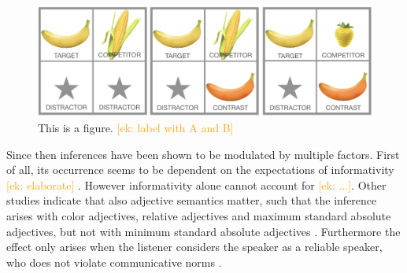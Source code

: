 \documentclass[10pt,letterpaper]{article}
\newcommand{\ek}[1]{\textcolor{Orange}{[ek: #1]}}
\newcommand{\jd}[1]{\textcolor{Purple}{[jd: #1]}}
\begin{document}

\begin{figure}
	\begin{center}
		\includegraphics[width=.475\textwidth]{graphs/example-context.pdf}
	\end{center}
\caption{This is a figure. \ek{label with A and B}} 
\label{example-context}
\end{figure}





Since then inferences have been shown to be modulated by multiple factors. First of all, its occurrence seems to be dependent on the expectations of informativity \ek{elaborate} \cite{Aparicio:2016, Aparicio:2018, Sedivy:2003}. However informativity alone cannot account for \ek{...}. Other studies indicate that also adjective semantics matter, such that the inference arises with color adjectives, relative adjectives and maximum standard absolute
adjectives, but not with minimum standard absolute adjectives \cite{Aparicio:2018}. Furthermore the effect only arises when the listener considers the speaker as a reliable speaker, who does not violate communicative norms \cite{Grodner:2011}.
\end{document}
